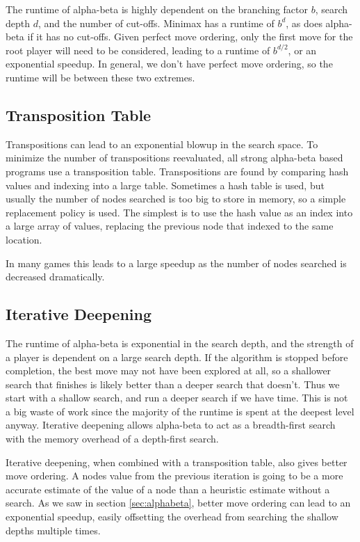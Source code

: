 The runtime of alpha-beta is highly dependent on the branching factor $b$, search depth $d$, and the number of cut-offs. Minimax has a runtime of $b^d$, as does alpha-beta if it has no cut-offs. Given perfect move ordering, only the first move for the root player will need to be considered, leading to a runtime of $b^{d/2}$, or an exponential speedup. In general, we don't have perfect move ordering, so the runtime will be between these two extremes.

\subsection{Transposition Table}

Transpositions can lead to an exponential blowup in the search space. To minimize the number of transpositions reevaluated, all strong alpha-beta based programs use a transposition table. Transpositions are found by comparing hash values and indexing into a large table. Sometimes a hash table is used, but usually the number of nodes searched is too big to store in memory, so a simple replacement policy is used. The simplest is to use the hash value as an index into a large array of values, replacing the previous node that indexed to the same location.

In many games this leads to a large speedup as the number of nodes searched is decreased dramatically.


\subsection{Iterative Deepening}

The runtime of alpha-beta is exponential in the search depth, and the strength of a player is dependent on a large search depth. If the algorithm is stopped before completion, the best move may not have been explored at all, so a shallower search that finishes is likely better than a deeper search that doesn't. Thus we start with a shallow search, and run a deeper search if we have time. This is not a big waste of work since the majority of the runtime is spent at the deepest level anyway. Iterative deepening allows alpha-beta to act as a breadth-first search with the memory overhead of a depth-first search.

Iterative deepening, when combined with a transposition table, also gives better move ordering. A nodes value from the previous iteration is going to be a more accurate estimate of the value of a node than a heuristic estimate without a search. As we saw in section \ref{sec:alphabeta}, better move ordering can lead to an exponential speedup, easily offsetting the overhead from searching the shallow depths multiple times.


